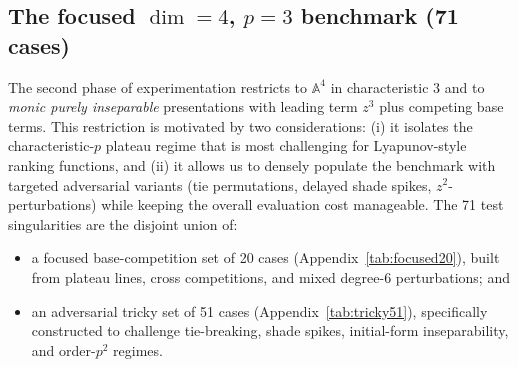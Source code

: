\documentclass[11pt]{amsart}
\begin{document}
\subsection{The focused $\dim=4$, $p=3$ benchmark (71 cases)}
The second phase of experimentation restricts to $\mathbb{A}^4$ in characteristic $3$ and to
\emph{monic purely inseparable} presentations with leading term $z^3$ plus competing base terms.
This restriction is motivated by two considerations:
(i) it isolates the characteristic-$p$ plateau regime that is most challenging for
Lyapunov-style ranking functions, and (ii) it allows us to densely populate the benchmark
with targeted adversarial variants (tie permutations, delayed shade spikes, $z^2$-perturbations)
while keeping the overall evaluation cost manageable. The 71 test singularities are the disjoint union of:
\begin{itemize}
  \item a focused base-competition set of 20 cases (Appendix~\ref{tab:focused20}),
  built from plateau lines, cross competitions, and mixed degree-$6$ perturbations; and
  \item an adversarial tricky set of 51 cases (Appendix~\ref{tab:tricky51}),
  specifically constructed to challenge tie-breaking, shade spikes, initial-form inseparability, and order-$p^2$ regimes.
\end{itemize}
\end{document}
